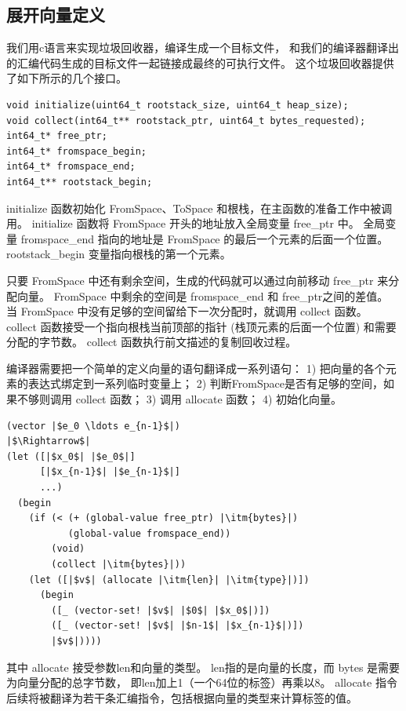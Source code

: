 \subsection{展开向量定义}

我们用c语言来实现垃圾回收器，编译生成一个目标文件，
和我们的编译器翻译出的汇编代码生成的目标文件一起链接成最终的可执行文件。
这个垃圾回收器提供了如下所示的几个接口。
\begin{lstlisting}
void initialize(uint64_t rootstack_size, uint64_t heap_size);
void collect(int64_t** rootstack_ptr, uint64_t bytes_requested);
int64_t* free_ptr;
int64_t* fromspace_begin;
int64_t* fromspace_end;
int64_t** rootstack_begin;
\end{lstlisting}

initialize 函数初始化 FromSpace、ToSpace 和根栈，在主函数的准备工作中被调用。
initialize 函数将 FromSpace 开头的地址放入全局变量 free\_ptr 中。
全局变量 fromspace\_end 指向的地址是 FromSpace 的最后一个元素的后面一个位置。
rootstack\_begin 变量指向根栈的第一个元素。

只要 FromSpace 中还有剩余空间，生成的代码就可以通过向前移动 free\_ptr 来分配向量。
FromSpace 中剩余的空间是 fromspace\_end 和 free\_ptr之间的差值。
当 FromSpace 中没有足够的空间留给下一次分配时，就调用 collect 函数。
collect 函数接受一个指向根栈当前顶部的指针 (栈顶元素的后面一个位置) 和需要分配的字节数。
collect 函数执行前文描述的复制回收过程。

编译器需要把一个简单的定义向量的语句翻译成一系列语句：
1) 把向量的各个元素的表达式绑定到一系列临时变量上；
2) 判断FromSpace是否有足够的空间，如果不够则调用 collect 函数；
3) 调用 allocate 函数；
4) 初始化向量。

\begin{lstlisting}
(vector |$e_0 \ldots e_{n-1}$|)
|$\Rightarrow$|
(let ([|$x_0$| |$e_0$|]
      [|$x_{n-1}$| |$e_{n-1}$|]
      ...)
  (begin
    (if (< (+ (global-value free_ptr) |\itm{bytes}|)
           (global-value fromspace_end))
        (void)
        (collect |\itm{bytes}|))
    (let ([|$v$| (allocate |\itm{len}| |\itm{type}|)])
      (begin
        ([_ (vector-set! |$v$| |$0$| |$x_0$|)])
        ([_ (vector-set! |$v$| |$n-1$| |$x_{n-1}$|)])
        |$v$|))))
\end{lstlisting}

其中 allocate 接受参数len和向量的类型。
len指的是向量的长度，而 bytes 是需要为向量分配的总字节数，
即len加上1（一个64位的标签）再乘以8。
allocate 指令后续将被翻译为若干条汇编指令，包括根据向量的类型来计算标签的值。
